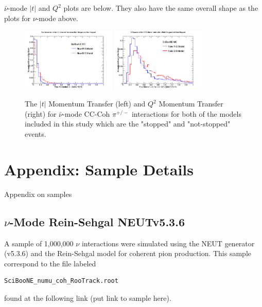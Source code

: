 \documentclass[11pt]{article}
\begin{document}
$\bar{\nu}$-mode $|t|$ and $Q^2$ plots are below. They also have the same overall shape as the plots for $\nu$-mode above.

\begin{figure}[H]
\centering
\includegraphics[width=0.4\textwidth]{CCCohPlots/ANMCCCohGoodT.png}
\includegraphics[width=0.4\textwidth]{CCCohPlots/ANMCCCohGoodQ2.png}
\caption{The $|t|$ Momentum Transfer (left) and $Q^2$ Momentum Transfer (right) for $\bar{\nu}$-mode CC-Coh $\pi^{+/-}$ interactions for both of the models included in this study which are the "stopped" and "not-stopped" events.}
\end{figure}\label{fig:AntiNuModeCCCohGoodTAndQ2}


%
\newpage

\appendix


\section{Appendix: Sample Details}\label{sec:SampleAppendix}

Appendix on samples

\subsection{$\nu$-Mode Rein-Sehgal NEUTv5.3.6}
A sample of 1,000,000 $\nu$ interactions were simulated using the NEUT generator (v5.3.6) and the Rein-Sehgal model for coherent pion production. This sample correspond to the file labeled 
\begin{verbatim}
SciBooNE_numu_coh_RooTrack.root
\end{verbatim}
found at the following link (put link to sample here).
\end{document}
